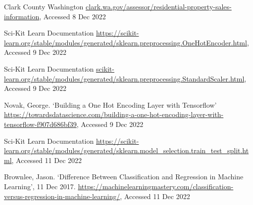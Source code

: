 \documentclass[12pt]{article}
\begin{document}
\newpage
\begin{thebibliography}{6}
    Clark County Washington \url{clark.wa.gov/assessor/residential-property-sales-information},
    Accessed 8 Dec 2022

    Sci-Kit Learn Documentation \url{https://scikit-learn.org/stable/modules/generated/sklearn.preprocessing.OneHotEncoder.html},
    Accessed 9 Dec 2022

    Sci-Kit Learn Documentation \url{scikit-learn.org/stable/modules/generated/sklearn.preprocessing.StandardScaler.html},
    Accessed 9 Dec 2022

    Novak, George. `Building a One Hot Encoding Layer with Tensorflow' \url{https://towardsdatascience.com/building-a-one-hot-encoding-layer-with-tensorflow-f907d686bf39},
    Accessed 9 Dec 2022

    Sci-Kit Learn Documentation \url{https://scikit-learn.org/stable/modules/generated/sklearn.model_selection.train_test_split.html},
    Accessed 11 Dec 2022

    Brownlee, Jason. `Difference Between Classification and Regression in Machine Learning', 11 Dec 2017. \url{https://machinelearningmastery.com/classification-versus-regression-in-machine-learning/},
    Accessed 11 Dec 2022
\end{thebibliography}
\end{document}
